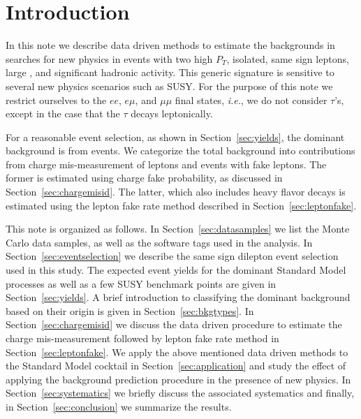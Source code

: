 \section{Introduction}
\label{sec:intro}
In this note we describe data driven methods to estimate the backgrounds in 
searches for new physics in events with two high $P_T$, isolated, same sign leptons,
large \met, and  significant hadronic activity.  This generic signature is sensitive to several
new physics scenarios such as SUSY.  For the purpose of this note we restrict
ourselves to the $ee$, $e\mu$, and $\mu\mu$ final states, {\em i.e.}, we 
do not consider $\tau$'s, except in the case that the $\tau$ decays leptonically.

For a reasonable event selection, as shown in Section~\ref{sec:yields}, the dominant
background is from \ttbar events. We categorize the total background into contributions
from charge mis-measurement of leptons and events with fake leptons. The former is estimated 
using charge fake probability, as discussed in Section~\ref{sec:chargemisid}. The latter, which
also includes  heavy flavor decays is estimated using the lepton fake rate 
method described in Section~\ref{sec:leptonfake}.

This note is organized as follows. In Section~\ref{sec:datasamples} we list the 
Monte Carlo data samples, as well as the software tags used 
in the analysis. In Section~\ref{sec:eventselection} we describe the same sign dilepton event 
selection used in this study.  The expected event yields for the dominant 
Standard Model processes as well as a few SUSY benchmark points are given in Section~\ref{sec:yields}.
A brief introduction to classifying the dominant background based on their origin
is given in Section~\ref{sec:bkgtypes}. In Section~\ref{sec:chargemisid} we discuss the data driven 
procedure to estimate the charge mis-measurement followed by lepton fake rate method in 
Section~\ref{sec:leptonfake}. We apply the above mentioned data driven methods to the Standard Model 
cocktail in Section~\ref{sec:application} and study the effect of applying the background
prediction procedure in the presence of new physics. In Section~\ref{sec:systematics} we briefly
discuss the associated systematics and finally, in Section~\ref{sec:conclusion}
we summarize the results.  

